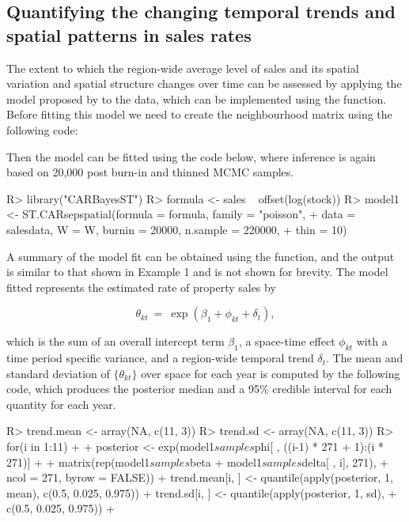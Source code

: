 \documentclass[article, nojss]{jss}
\begin{document}
\subsection{Quantifying the changing temporal trends and spatial patterns in sales rates}
The extent to which the region-wide average level of sales and its spatial variation and spatial structure changes over time can be assessed by applying the model proposed by \cite{napier2016} to the data, which can be implemented using the  function. Before fitting this model we need to create the neighbourhood matrix using the following code:


\begin{Schunk}
\end{Schunk}

Then the model can be fitted using the code below, where inference is again based on 20,000 post burn-in and thinned MCMC samples.  


\begin{CodeInput}
R>  library("CARBayesST")
R>  formula <- sales ~ offset(log(stock))
R>  model1 <- ST.CARsepspatial(formula = formula, family = "poisson", 
+       data = salesdata, W = W, burnin = 20000, n.sample = 220000, 
+       thin = 10)
\end{CodeInput}


A summary of the model fit can be obtained using the  function, and the output is similar to that shown in Example 1 and is not shown for brevity. The model fitted represents the estimated rate of property sales by

$$\theta_{kt}~=~\exp(\beta_1 + \phi_{kt} + \delta_t),$$

which is the sum of an overall intercept term $\beta_1$, a space-time effect $\phi_{kt}$ with a time period specific variance, and a region-wide temporal trend $\delta_t$. The mean and standard deviation of $\{\theta_{kt}\}$ over space for each year is computed by the following code, which produces the posterior median and a 95\% credible interval for each quantity for each year.


\begin{CodeInput}
R>  trend.mean <- array(NA, c(11, 3))
R>  trend.sd <- array(NA, c(11, 3))
R>    for(i in 1:11)
+     {
+     posterior <- exp(model1$samples$phi[ , ((i-1) * 271 + 1):(i * 271)] + 
+       matrix(rep(model1$samples$beta + model1$samples$delta[ , i], 271), 
+       ncol = 271, byrow = FALSE))
+     trend.mean[i, ] <- quantile(apply(posterior, 1, mean), 
        c(0.5, 0.025, 0.975))
+     trend.sd[i, ] <- quantile(apply(posterior, 1, sd), 
+       c(0.5, 0.025, 0.975))
+     }
\end{CodeInput}
\end{document}
